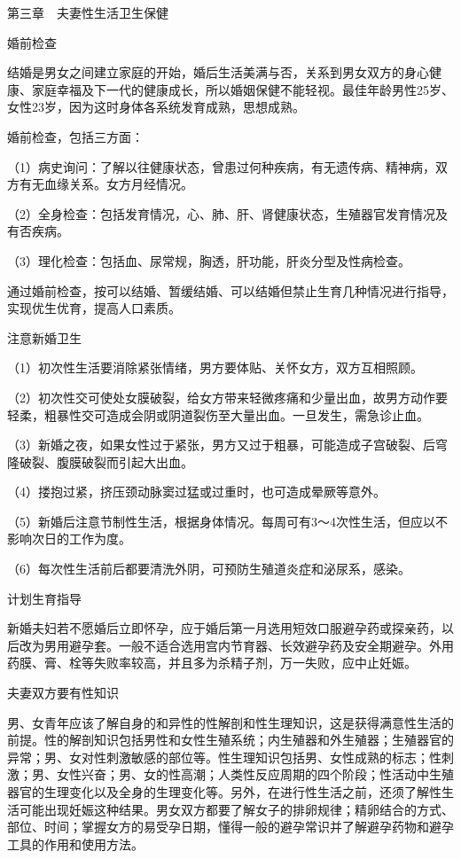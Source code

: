 \documentclass[12pt,UTF8]{ctexbook}
\begin{document}
第三章　夫妻性生活卫生保健


婚前检查


结婚是男女之间建立家庭的开始，婚后生活美满与否，关系到男女双方的身心健康、家庭幸福及下一代的健康成长，所以婚姻保健不能轻视。最佳年龄男性25岁、女性23岁，因为这时身体各系统发育成熟，思想成熟。

婚前检查，包括三方面：

（1）病史询问：了解以往健康状态，曾患过何种疾病，有无遗传病、精神病，双方有无血缘关系。女方月经情况。

（2）全身检查：包括发育情况，心、肺、肝、肾健康状态，生殖器官发育情况及有否疾病。

（3）理化检查：包括血、尿常规，胸透，肝功能，肝炎分型及性病检查。

通过婚前检查，按可以结婚、暂缓结婚、可以结婚但禁止生育几种情况进行指导，实现优生优育，提高人口素质。





注意新婚卫生


（1）初次性生活要消除紧张情绪，男方要体贴、关怀女方，双方互相照顾。

（2）初次性交可使处女膜破裂，给女方带来轻微疼痛和少量出血，故男方动作要轻柔，粗暴性交可造成会阴或阴道裂伤至大量出血。一旦发生，需急诊止血。

（3）新婚之夜，如果女性过于紧张，男方又过于粗暴，可能造成子宫破裂、后穹隆破裂、腹膜破裂而引起大出血。

（4）搂抱过紧，挤压颈动脉窦过猛或过重时，也可造成晕厥等意外。

（5）新婚后注意节制性生活，根据身体情况。每周可有3～4次性生活，但应以不影响次日的工作为度。

（6）每次性生活前后都要清洗外阴，可预防生殖道炎症和泌尿系，感染。





计划生育指导


新婚夫妇若不愿婚后立即怀孕，应于婚后第一月选用短效口服避孕药或探亲药，以后改为男用避孕套。一般不适合选用宫内节育器、长效避孕药及安全期避孕。外用药膜、膏、栓等失败率较高，并且多为杀精子剂，万一失败，应中止妊娠。





夫妻双方要有性知识


男、女青年应该了解自身的和异性的性解剖和性生理知识，这是获得满意性生活的前提。性的解剖知识包括男性和女性生殖系统；内生殖器和外生殖器；生殖器官的异常；男、女对性刺激敏感的部位等。性生理知识包括男、女性成熟的标志；性刺激；男、女性兴奋；男、女的性高潮；人类性反应周期的四个阶段；性活动中生殖器官的生理变化以及全身的生理变化等。另外，在进行性生活之前，还须了解性生活可能出现妊娠这种结果。男女双方都要了解女子的排卵规律；精卵结合的方式、部位、时间；掌握女方的易受孕日期，懂得一般的避孕常识并了解避孕药物和避孕工具的作用和使用方法。
\end{document}
